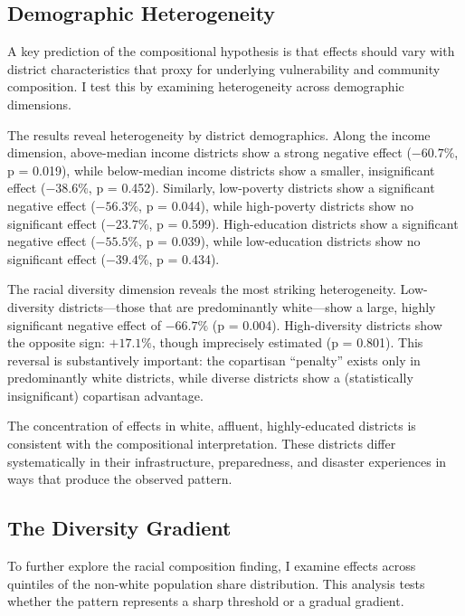\documentclass[12pt,letterpaper,oneside]{book}
\newcommand{\basepath}{g:/My Drive/Grad School}
\newcommand{\basepath}{basepath}
\begin{document}
\subsection{Demographic Heterogeneity}

A key prediction of the compositional hypothesis is that effects should vary with district characteristics that proxy for underlying vulnerability and community composition. I test this by examining heterogeneity across demographic dimensions.



The results reveal heterogeneity by district demographics. Along the income dimension, above-median income districts show a strong negative effect ($-60.7\%$, p = 0.019), while below-median income districts show a smaller, insignificant effect ($-38.6\%$, p = 0.452). Similarly, low-poverty districts show a significant negative effect ($-56.3\%$, p = 0.044), while high-poverty districts show no significant effect ($-23.7\%$, p = 0.599). High-education districts show a significant negative effect ($-55.5\%$, p = 0.039), while low-education districts show no significant effect ($-39.4\%$, p = 0.434).

The racial diversity dimension reveals the most striking heterogeneity. Low-diversity districts---those that are predominantly white---show a large, highly significant negative effect of $-66.7\%$ (p = 0.004). High-diversity districts show the opposite sign: $+17.1\%$, though imprecisely estimated (p = 0.801). This reversal is substantively important: the copartisan ``penalty'' exists only in predominantly white districts, while diverse districts show a (statistically insignificant) copartisan advantage.

The concentration of effects in white, affluent, highly-educated districts is consistent with the compositional interpretation. These districts differ systematically in their infrastructure, preparedness, and disaster experiences in ways that produce the observed pattern.

\subsection{The Diversity Gradient}

To further explore the racial composition finding, I examine effects across quintiles of the non-white population share distribution. This analysis tests whether the pattern represents a sharp threshold or a gradual gradient.
\end{document}
